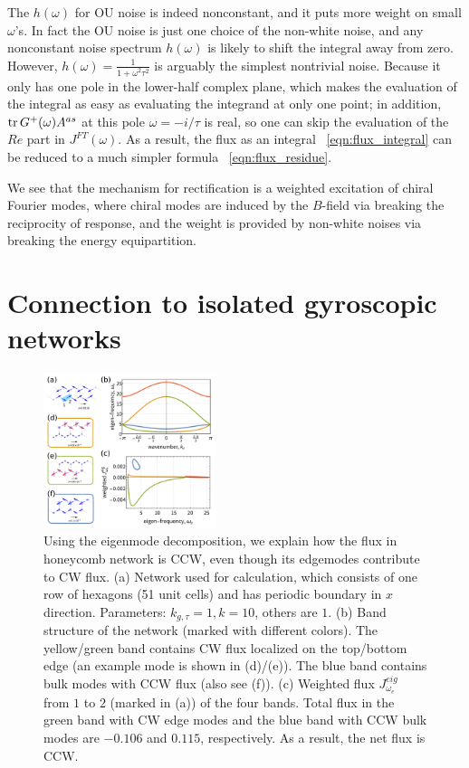 \documentclass[
 preprint,
 preprintnumbers,
 amsmath,amssymb,
 aps,
 pre,
 longbibliography,
 10pt, twocolumn
]{revtex4-1}
\begin{document}
The $h(\omega)$ for OU noise is indeed nonconstant, and it puts more weight on small $\omega$'s.
In fact the OU noise is just one choice of the non-white noise, and any nonconstant noise spectrum $h(\omega)$ is likely to shift the integral away from zero.
However, $h(\omega)=\frac{1}{1+\omega^2\tau^2}$ is arguably the simplest nontrivial noise. Because it only has one pole in the lower-half complex plane, which makes the evaluation of the integral as easy as evaluating the integrand at only one point; in addition, $\tr G^+(\omega)A^{as}$ at this pole $\omega=-i/\tau$ is real, so one can skip the evaluation of the $Re$ part in $J^{FT}(\omega)$. As a result, the flux as an integral \eqnname~\eqref{eqn:flux_integral} can be reduced to a much simpler formula \eqnname~\eqref{eqn:flux_residue}.

We see that the mechanism for rectification is a weighted excitation of chiral Fourier modes, where chiral modes are induced by the $B$-field via breaking the reciprocity of response, and the weight is provided by non-white noises via breaking the energy equipartition.


\section{Connection to isolated gyroscopic networks} \label{sec:eigenmode}

\begin{figure}[ht]
	\centering
	\includegraphics[width=0.45\textwidth]{3_eigen_modes.pdf}
    \caption{Using the eigenmode decomposition, we explain how the flux in honeycomb network is CCW, even though its edgemodes contribute to CW flux.
    (a) Network used for calculation, which consists of one row of hexagons (51 unit cells) and has periodic boundary in $x$ direction. Parameters: $k_{g,\tau}=1, k=10$, others are $1$.
    (b) Band structure of the network (marked with different colors). The yellow/green band contains CW flux localized on the top/bottom edge (an example mode is shown in (d)/(e)). The blue band contains bulk modes with CCW flux (also see (f)).
    (c) Weighted flux $J_{\omega_e}^{eig}$ from $1$ to $2$ (marked in (a)) of the four bands. Total flux in the green band with CW edge modes and the blue band with CCW bulk modes are $-0.106$ and $0.115$, respectively. As a result, the net flux is CCW.
    }
    \label{fig:eigen_modes}
\end{figure}
\end{document}
